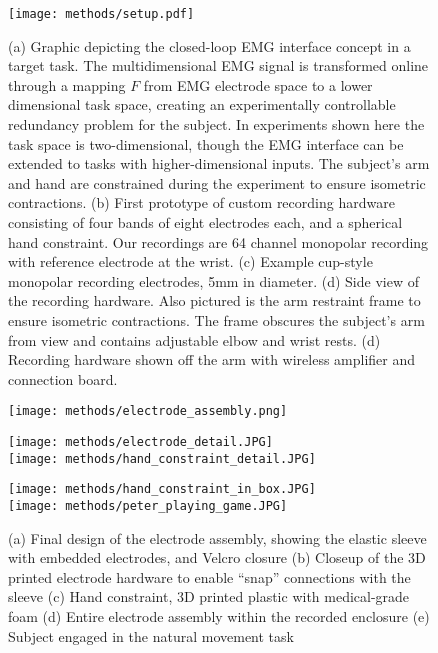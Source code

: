 \documentclass[../main.tex]{subfiles}
\begin{document}
\begin{figure}[H]%
\centering
\texttt{[image: methods/setup.pdf]}
\caption[Experimental setup prototype]{(a) Graphic depicting the closed-loop EMG interface concept in a target task. The multidimensional EMG signal is transformed online through a mapping $F$ from EMG electrode space to a lower dimensional task space, creating an experimentally controllable redundancy problem for the subject. In experiments shown here the task space is two-dimensional, though the EMG interface can be extended to tasks with higher-dimensional inputs. The subject's arm and hand are constrained during the experiment to ensure isometric contractions. (b) First prototype of custom recording hardware consisting of four bands of eight electrodes each, and a spherical hand constraint. Our recordings are 64 channel monopolar recording with reference electrode at the wrist. (c) Example cup-style monopolar recording electrodes, 5mm in diameter. (d) Side view of the recording hardware. Also pictured is the arm restraint frame to ensure isometric contractions. The frame obscures the subject's arm from view and contains adjustable elbow and wrist rests. (d) Recording hardware shown off the arm with wireless amplifier and connection board.}\label{fig:prototype_setup}
\end{figure}

\begin{figure}[H]%
  \centering
  \begin{minipage}{0.33\textwidth}
    \texttt{[image: methods/electrode\_assembly.png]}
    \subcaption{}
  \end{minipage}%
  \hspace*{5pt}
  \begin{minipage}{0.33\textwidth}
    \texttt{[image: methods/electrode\_detail.JPG]}\\
    \subcaption{}
    \texttt{[image: methods/hand\_constraint\_detail.JPG]}
    \subcaption{}
  \end{minipage}%
  \hspace*{5pt}
  \begin{minipage}{0.33\textwidth}
    \texttt{[image: methods/hand\_constraint\_in\_box.JPG]}\\
    \subcaption{}
    \texttt{[image: methods/peter\_playing\_game.JPG]}
    \subcaption{}
  \end{minipage}
  \caption[Final experimental setup]{(a) Final design of the electrode assembly, showing the elastic sleeve with embedded electrodes, and Velcro closure (b) Closeup of the 3D printed electrode hardware to enable ``snap'' connections with the sleeve (c) Hand constraint, 3D printed plastic with medical-grade foam (d) Entire electrode assembly within the recorded enclosure (e) Subject engaged in the natural movement task}\label{fig:final_setup}
\end{figure}
\end{document}
